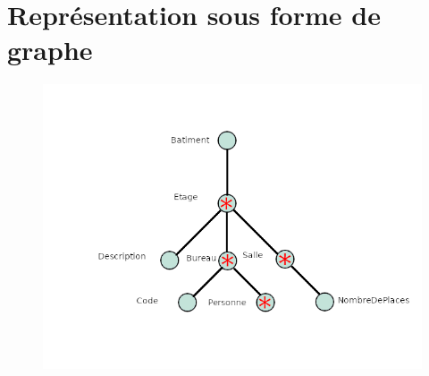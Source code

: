 \chapter{Représentation sous forme de graphe}
\begin{figure}
  \includegraphics[width=\linewidth]{graphe_dtd_to_rel.png}
\end{figure}
